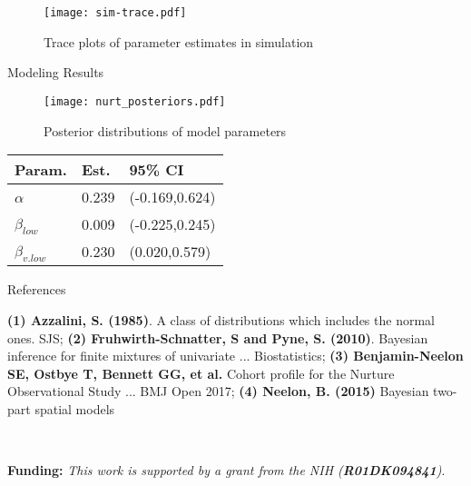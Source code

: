 \documentclass[final]{beamer}
\newlength{\onecolwid}
\begin{document}
\begin{frame}[t]
\begin{columns}[t]
\begin{column}{\onecolwid}

\begin{figure}
\texttt{[image: sim-trace.pdf]}
\caption{Trace plots of parameter estimates in simulation}
\end{figure}

\begin{block}{Modeling Results}

\begin{figure}
\texttt{[image: nurt\_posteriors.pdf]}
\caption{Posterior distributions of model parameters}
\end{figure}

\begin{table}
\vspace{0ex}
\begin{tabular}{l l l}
\toprule
\textbf{Param.} & \textbf{Est.} & \textbf{95\% CI}\\
\midrule
$\alpha$  \ & 0.239 & (-0.169,0.624) \\
$\beta_{low}$ \  & 0.009 & (-0.225,0.245)\\
$\beta_{v.low}$ \  & 0.230 & (0.020,0.579)\\
\bottomrule
\end{tabular}

\end{table}

\end{block}

\begin{block}{References}

\tiny  \textbf{(1) Azzalini, S. (1985)}. A class of distributions which includes the normal ones. SJS; \textbf{(2) Fruhwirth-Schnatter, S and Pyne, S. (2010)}. Bayesian inference for finite mixtures of univariate ... Biostatistics; \textbf{(3) Benjamin-Neelon SE, Ostbye T, Bennett GG, et al.} Cohort profile for the Nurture Observational Study ... BMJ Open 2017; \textbf{(4) Neelon, B. (2015)} Bayesian two-part spatial models

\

\tiny \textbf{Funding:} \textit{This work is supported by a grant from the NIH (\textbf{R01DK094841})}.

\end{block}





\end{column}
\end{columns}
\end{frame}
\end{document}
